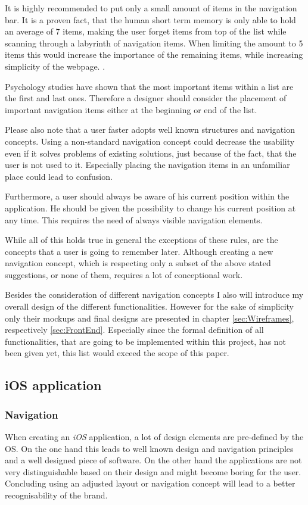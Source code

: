 It is highly recommended to put only a small amount of items in the navigation bar. It is a proven fact, that the human short term memory is only able to hold an average of 7 items, making the user forget items from top of the list while scanning through a labyrinth of navigation items. When limiting the amount to 5 items this would increase the importance of the remaining items, while increasing simplicity of the webpage. \cite{Crestodina:2015aa}. 

Psychology studies have shown that the most important items within a list are the first and last ones. Therefore a designer should consider the placement of important navigation items either at the beginning or end of the list. \cite{Crestodina:2015aa}

Please also note that a user faster adopts well known structures and navigation concepts. Using a non-standard navigation concept could decrease the usability even if it solves problems of existing solutions, just because of the fact, that the user is not used to it. Especially placing the navigation items in an unfamiliar place could lead to confusion. \cite{Crestodina:2015aa}

Furthermore, a user should always be aware of his current position within the application. He should be given the possibility to change his current position at any time. This requires the need of always visible navigation elements. 

While all of this holds true in general the exceptions of these rules, are the concepts that a user is going to remember later. Although creating a new navigation concept, which is respecting only a subset of the above stated suggestions, or none of them, requires a lot of conceptional work. \cite{Hampton-Smith:2013aa}

Besides the consideration of different navigation concepts I also will introduce my overall design of the different functionalities. However for the sake of simplicity only their mockups and final designs are presented in chapter \vref{sec:Wireframes}, respectively  \vref{sec:FrontEnd}. Especially since the formal definition of all functionalities, that are going to be implemented within this project, has not been given yet, this list would exceed the scope of this paper.

\subsection{iOS application}
\label{sec:UIConceptiOS}
\subsubsection{Navigation}
When creating an \emph{iOS} application, a lot of design elements are pre-defined by the \gls{OS}. On the one hand this leads to well known design and navigation principles and a well designed piece of software. On the other hand the applications are not very distinguishable based on their design and might become boring for the user. Concluding using an adjusted layout or navigation concept will lead to a better recognisability of the brand. 


